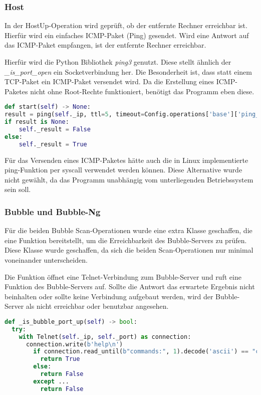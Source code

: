 \subsubsection{Host}
In der HostUp-Operation wird geprüft, ob der entfernte Rechner erreichbar ist. Hierfür wird ein einfaches ICMP-Paket (Ping) gesendet. Wird eine Antwort auf das ICMP-Paket empfangen, ist der entfernte Rechner erreichbar.

Hierfür wird die Python Bibliothek \textit{ping3} genutzt. Diese stellt ähnlich der \textit{\_is\_port\_open} ein Socketverbindung her. Die Besonderheit ist, dass statt einem TCP-Paket ein ICMP-Paket versendet wird. Da die Erstellung eines ICMP-Paketes nicht ohne Root-Rechte funktioniert, benötigt das Programm eben diese.

\begin{lstlisting}[language=Python, frame=single, caption={Big Brother HostUp Ping}, captionpos=b, label={lst:bigbrother-host-up}]
def start(self) -> None:
result = ping(self._ip, ttl=5, timeout=Config.operations['base']['ping_timeout'])
if result is None:
	self._result = False
else:
	self._result = True
\end{lstlisting}

Für das Versenden eines ICMP-Paketes hätte auch  die in Linux implementierte ping-Funktion per syscall verwendet werden können. Diese Alternative wurde nicht gewählt, da das Programm unabhängig vom unterliegenden Betriebssystem sein soll.
 
\subsubsection{Bubble und Bubble-Ng}
Für die beiden Bubble Scan-Operationen wurde eine extra Klasse geschaffen, die eine Funktion bereitstellt, um die Erreichbarkeit des Bubble-Servers zu prüfen. Diese Klasse wurde geschaffen, da sich die beiden Scan-Operationen nur minimal voneinander unterscheiden.

Die Funktion öffnet eine Telnet-Verbindung zum Bubble-Server und ruft eine Funktion des Bubble-Servers auf. Sollte die Antwort das erwartete Ergebnis nicht beinhalten oder sollte keine Verbindung aufgebaut werden, wird der Bubble-Server  als nicht erreichbar oder benutzbar angesehen.

\begin{lstlisting}[language=Python, frame=single, caption={Big Brother Buble Port Prüfung}, captionpos=b, label={lst:bigbrother-host-up}]
def _is_bubble_port_up(self) -> bool:
  try:
    with Telnet(self._ip, self._port) as connection:
      connection.write(b'help\n')
        if connection.read_until(b"commands:", 1).decode('ascii') == "commands:":
          return True
        else:
          return False
        except ...
          return False
\end{lstlisting} 

